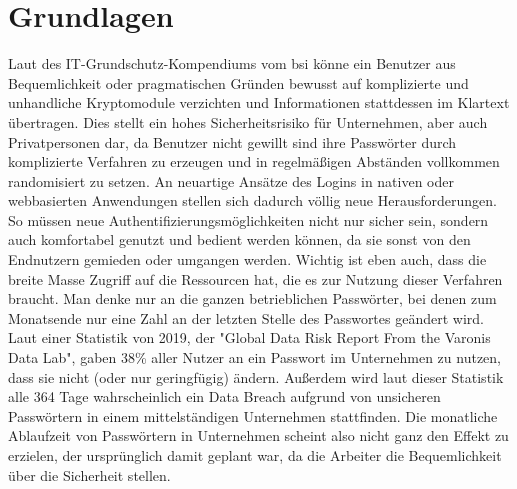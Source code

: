 \chapter{Grundlagen}
Laut des IT-Grundschutz-Kompendiums vom \ac{bsi} könne ein Benutzer aus Bequemlichkeit oder pragmatischen Gründen bewusst auf komplizierte und unhandliche Kryptomodule verzichten und Informationen stattdessen im Klartext übertragen. \cite{A1} Dies stellt ein hohes Sicherheitsrisiko für Unternehmen, aber auch Privatpersonen dar, da Benutzer nicht gewillt sind ihre Passwörter durch komplizierte Verfahren zu erzeugen und in regelmäßigen Abständen vollkommen randomisiert zu setzen. An neuartige Ansätze des Logins in nativen oder webbasierten Anwendungen stellen sich dadurch völlig neue Herausforderungen. So müssen neue Authentifizierungsmöglichkeiten nicht nur sicher sein, sondern auch komfortabel genutzt und bedient werden können, da sie sonst von den Endnutzern gemieden oder umgangen werden. Wichtig ist eben auch, dass die breite Masse Zugriff auf die Ressourcen hat, die es zur Nutzung dieser Verfahren braucht. Man denke nur an die ganzen betrieblichen Passwörter, bei denen zum Monatsende nur eine Zahl an der letzten Stelle des Passwortes geändert wird. Laut einer Statistik von 2019, der "Global Data Risk Report From the Varonis Data Lab", gaben 38\% aller Nutzer an ein Passwort im Unternehmen zu nutzen, dass sie nicht (oder nur geringfügig) ändern. Außerdem wird laut dieser Statistik alle 364 Tage wahrscheinlich ein Data Breach aufgrund von unsicheren Passwörtern in einem mittelständigen Unternehmen stattfinden. Die monatliche Ablaufzeit von Passwörtern in Unternehmen scheint also nicht ganz den Effekt zu erzielen, der ursprünglich damit geplant war, da die Arbeiter die Bequemlichkeit über die Sicherheit stellen.

